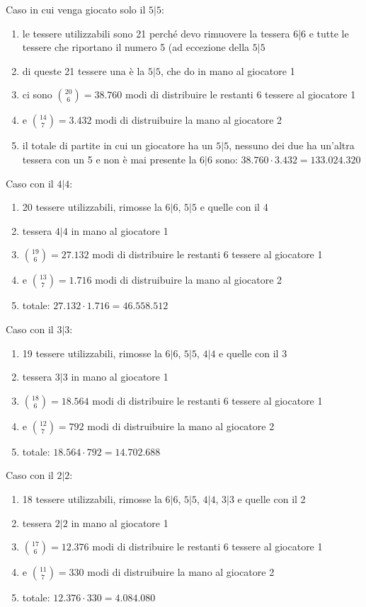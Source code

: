 \documentclass[a4paper,12pt]{report}
\begin{document}
Caso in cui venga giocato solo il \(5|5\):
\begin{enumerate}
    \item le tessere utilizzabili sono 21 perché devo rimuovere la tessera 6|6 e tutte le tessere che riportano il numero 5 (ad eccezione della \(5|5\) 
    \item di queste 21 tessere una è la \(5|5\), che do in mano al giocatore 1
    \item ci sono \(\binom{20}{6} = 38.760\) modi di distribuire le restanti 6 tessere al giocatore 1
    \item e \(\binom{14}{7} = 3.432\) modi di distruibuire la mano al giocatore 2
    \item il totale di partite in cui un giocatore ha un \(5|5\), nessuno dei due ha un'altra tessera con un 5 e non è mai presente la \(6|6\) sono: \(38.760 \cdot 3.432 = 133.024.320\)
\end{enumerate}

Caso con il \(4|4\):
\begin{enumerate}
    \item 20 tessere utilizzabili, rimosse la \(6|6\), \(5|5\) e quelle con il 4 
    \item tessera \(4|4\) in mano al giocatore 1
    \item \(\binom{19}{6} = 27.132\) modi di distribuire le restanti 6 tessere al giocatore 1
    \item e \(\binom{13}{7} = 1.716\) modi di distruibuire la mano al giocatore 2
    \item totale: \( 27.132 \cdot 1.716 = 46.558.512 \)
\end{enumerate}

Caso con il \(3|3\):
\begin{enumerate}
    \item 19 tessere utilizzabili, rimosse la \(6|6\), \(5|5\), \(4|4\) e quelle con il 3 
    \item tessera \(3|3\) in mano al giocatore 1
    \item \(\binom{18}{6} = 18.564\) modi di distribuire le restanti 6 tessere al giocatore 1
    \item e \(\binom{12}{7} = 792\) modi di distruibuire la mano al giocatore 2
    \item totale: \( 18.564 \cdot 792 = 14.702.688 \)
\end{enumerate}

Caso con il \(2|2\):
\begin{enumerate}
    \item 18 tessere utilizzabili, rimosse la \(6|6\), \(5|5\), \(4|4\), \(3|3\) e quelle con il 2 
    \item tessera \(2|2\) in mano al giocatore 1
    \item \(\binom{17}{6} = 12.376\) modi di distribuire le restanti 6 tessere al giocatore 1
    \item e \(\binom{11}{7} = 330\) modi di distruibuire la mano al giocatore 2
    \item totale: \( 12.376 \cdot 330 = 4.084.080 \)
\end{enumerate}
\end{document}
